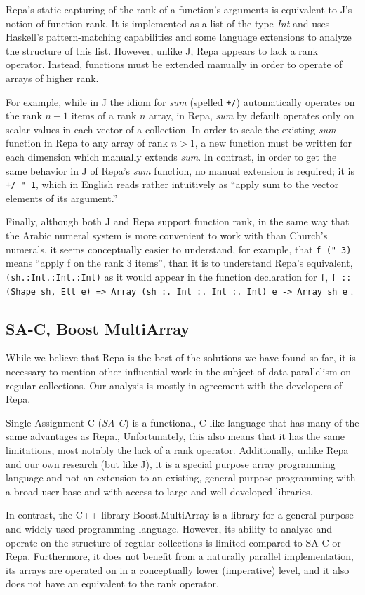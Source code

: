 Repa's static capturing of the rank of a function's arguments is equivalent to J's notion of function rank.
It is implemented as a list of the type \textit{Int} and 
uses Haskell's pattern-matching capabilities and some language extensions to analyze the structure of this list.
However, unlike J, Repa appears to lack a rank operator.
Instead, functions must be extended manually in order to operate of arrays of higher rank.

For example, while in J the idiom for \textit{sum} (spelled \texttt{+/}) 
automatically operates on the rank $n-1$ items of a rank $n$ array, 
in Repa, \textit{sum} by default operates only on scalar values in each vector of a collection.
In order to scale the existing \textit{sum} function in Repa to any array of rank $n > 1$, 
a new function must be written for each dimension which manually extends \textit{sum}\cite{dph}.
In contrast, in order to get the same behavior in J of Repa's \textit{sum} function, no manual extension is required; 
it is \texttt{+/ " 1}, which in English reads rather intuitively as ``apply sum to the vector elements of its argument.''

Finally, although both J and Repa support function rank, 
in the same way that the Arabic numeral system is more convenient to work with than Church's numerals, %
it seems conceptually easier to understand, for example, 
that \texttt{f (" 3)} means ``apply f on the rank 3 items'', than it is to understand Repa's equivalent, 
\texttt{(sh.:Int.:Int.:Int)} as it would appear in the function declaration for \texttt{f}, 
\texttt{f :: (Shape sh, Elt e) => Array (sh :. Int :. Int :. Int) e -> Array sh e} .

\subsection{SA-C, Boost MultiArray}
While we believe that Repa is the best of the solutions we have found so far, 
it is necessary to mention other influential work in the subject of data parallelism on regular collections.
Our analysis is mostly in agreement with the developers of Repa.\cite{dph}

Single-Assignment C (\textit{SA-C}) is a functional, C-like language 
that has many of the same advantages as Repa.\cite{dph}, \cite{sac}
Unfortunately, this also means that it has the same limitations, most notably the lack of a rank operator.
Additionally, unlike Repa and our own research (but like J), 
it is a special purpose array programming language and 
not an extension to an existing, general purpose programming with a broad user base and 
with access to large and well developed libraries.

In contrast, the C++ library Boost.MultiArray is a library for a general purpose and widely used programming language. \cite{boost}
However, its ability to analyze and operate on the structure of regular collections is limited compared to SA-C or Repa.
Furthermore, it does not benefit from a naturally parallel implementation, 
its arrays are operated on in a conceptually lower (imperative) level, 
and it also does not have an equivalent to the rank operator. 
